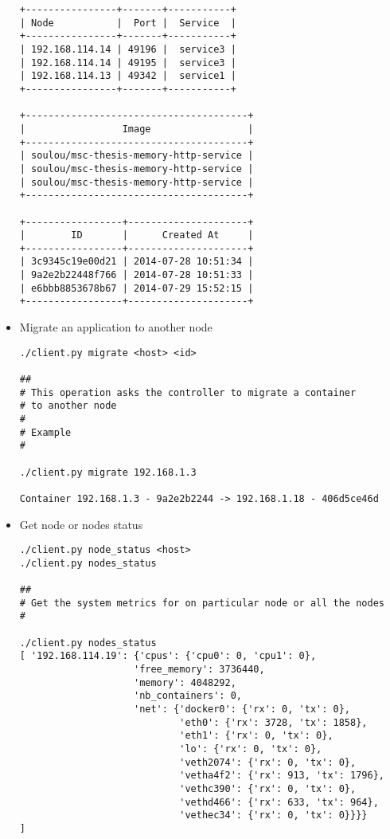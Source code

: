 \begin{itemize}
{\begin{lstlisting}
+----------------+-------+-----------+
| Node           |  Port |  Service  |
+----------------+-------+-----------+
| 192.168.114.14 | 49196 |  service3 |
| 192.168.114.14 | 49195 |  service3 |
| 192.168.114.13 | 49342 |  service1 |
+----------------+-------+-----------+

+---------------------------------------+
|                 Image                 |
+---------------------------------------+
| soulou/msc-thesis-memory-http-service |
| soulou/msc-thesis-memory-http-service |
| soulou/msc-thesis-memory-http-service |
+---------------------------------------+

+-----------------+---------------------+
|        ID       |      Created At     |
+-----------------+---------------------+
| 3c9345c19e00d21 | 2014-07-28 10:51:34 |
| 9a2e2b22448f766 | 2014-07-28 10:51:33 |
| e6bbb8853678b67 | 2014-07-29 15:52:15 |
+-----------------+---------------------+
\end{lstlisting}}
\item{Migrate an application to another node
\begin{lstlisting}
./client.py migrate <host> <id>

##
# This operation asks the controller to migrate a container
# to another node
#
# Example
#

./client.py migrate 192.168.1.3

Container 192.168.1.3 - 9a2e2b2244 -> 192.168.1.18 - 406d5ce46d
\end{lstlisting}}
\item{Get node or nodes status
\begin{lstlisting}
./client.py node_status <host>
./client.py nodes_status

##
# Get the system metrics for on particular node or all the nodes
#

./client.py nodes_status
[ '192.168.114.19': {'cpus': {'cpu0': 0, 'cpu1': 0},
                    'free_memory': 3736440,
                    'memory': 4048292,
                    'nb_containers': 0,
                    'net': {'docker0': {'rx': 0, 'tx': 0},
                            'eth0': {'rx': 3728, 'tx': 1858},
                            'eth1': {'rx': 0, 'tx': 0},
                            'lo': {'rx': 0, 'tx': 0},
                            'veth2074': {'rx': 0, 'tx': 0},
                            'vetha4f2': {'rx': 913, 'tx': 1796},
                            'vethc390': {'rx': 0, 'tx': 0},
                            'vethd466': {'rx': 633, 'tx': 964},
                            'vethec34': {'rx': 0, 'tx': 0}}}}
]
\end{lstlisting}}
\end{itemize}
